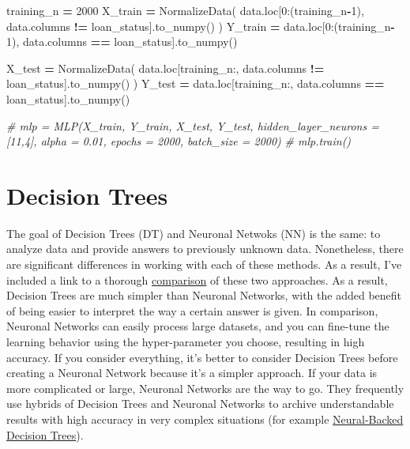\documentclass[
]{book}
\newenvironment{Shaded}{\begin{snugshade}}{\end{snugshade}}
\newcommand{\CommentTok}[1]{\textcolor[rgb]{0.56,0.35,0.01}{\textit{#1}}}
\newcommand{\DecValTok}[1]{\textcolor[rgb]{0.00,0.00,0.81}{#1}}
\newcommand{\NormalTok}[1]{#1}
\newcommand{\OperatorTok}[1]{\textcolor[rgb]{0.81,0.36,0.00}{\textbf{#1}}}
\newcommand{\StringTok}[1]{\textcolor[rgb]{0.31,0.60,0.02}{#1}}
\begin{document}
\begin{Shaded}
\begin{Highlighting}[]
\NormalTok{training\_n }\OperatorTok{=} \DecValTok{2000}
\NormalTok{X\_train }\OperatorTok{=}\NormalTok{ NormalizeData( data.loc[}\DecValTok{0}\NormalTok{:(training\_n}\OperatorTok{{-}}\DecValTok{1}\NormalTok{), data.columns }\OperatorTok{!=} \StringTok{\textquotesingle{}loan\_status\textquotesingle{}}\NormalTok{].to\_numpy() )}
\NormalTok{Y\_train }\OperatorTok{=}\NormalTok{ data.loc[}\DecValTok{0}\NormalTok{:(training\_n}\OperatorTok{{-}}\DecValTok{1}\NormalTok{), data.columns }\OperatorTok{==} \StringTok{\textquotesingle{}loan\_status\textquotesingle{}}\NormalTok{].to\_numpy()}

\NormalTok{X\_test }\OperatorTok{=}\NormalTok{ NormalizeData( data.loc[training\_n:, data.columns }\OperatorTok{!=} \StringTok{\textquotesingle{}loan\_status\textquotesingle{}}\NormalTok{].to\_numpy() )}
\NormalTok{Y\_test }\OperatorTok{=}\NormalTok{ data.loc[training\_n:, data.columns }\OperatorTok{==} \StringTok{\textquotesingle{}loan\_status\textquotesingle{}}\NormalTok{].to\_numpy()}


\CommentTok{\# mlp = MLP(X\_train, Y\_train, X\_test, Y\_test, hidden\_layer\_neurons = [11,4], alpha = 0.01, epochs = 2000, batch\_size = 2000)}
\CommentTok{\# mlp.train()}
\end{Highlighting}
\end{Shaded}

\hypertarget{decision-trees}{%
\chapter{Decision Trees}\label{decision-trees}}

The goal of Decision Trees (DT) and Neuronal Netwoks (NN) is the same: to analyze data and provide answers to previously unknown data. Nonetheless, there are significant differences in working with each of these methods. As a result, I've included a link to a thorough \href{https://www.kdnuggets.com/2019/06/random-forest-vs-neural-network.html}{comparison} of these two approaches. As a result, Decision Trees are much simpler than Neuronal Networks, with the added benefit of being easier to interpret the way a certain answer is given. In comparison, Neuronal Networks can easily process large datasets, and you can fine-tune the learning behavior using the hyper-parameter you choose, resulting in high accuracy. If you consider everything, it's better to consider Decision Trees before creating a Neuronal Network because it's a simpler approach. If your data is more complicated or large, Neuronal Networks are the way to go. They frequently use hybrids of Decision Trees and Neuronal Networks to archive understandable results with high accuracy in very complex situations (for example \href{https://bair.berkeley.edu/blog/2020/04/23/decisions/}{Neural-Backed Decision Trees}).
\end{document}
